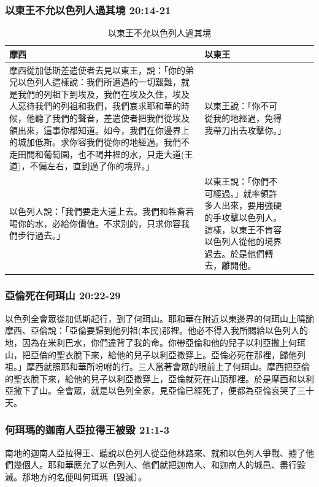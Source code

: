 \subsubsection{以東王不允以色列人過其境 20:14-21}
\begin{table}[H]
\begin{threeparttable}
\begin{tabular}{@{}p{}*{4}{L{\tabcolsep\relax}}@{}}
\toprule
摩西 &  以東王 \\\hline
摩西從加低斯差遣使者去見以東王，說：「你的弟兄以色列人這樣說：我們所遭遇的一切艱難，就是我們的列祖下到埃及，我們在埃及久住，埃及人惡待我們的列祖和我們，我們哀求耶和華的時候，他聽了我們的聲音，差遣使者把我們從埃及領出來，這事你都知道。如今，我們在你邊界上的城加低斯。求你容我們從你的地經過。我們不走田間和葡萄園，也不喝井裡的水，只走大道(王道)，不偏左右，直到過了你的境界。」
&以東王說：「你不可從我的地經過，免得我帶刀出去攻擊你。」\tabularnewline\hline
以色列人說：「我們要走大道上去。我們和牲畜若喝你的水，必給你價值。不求別的，只求你容我們步行過去。」
&以東王說：「你們不可經過。」就率領許多人出來，要用強硬的手攻擊以色列人。這樣，以東王不肯容以色列人從他的境界過去。於是他們轉去，離開他。\tabularnewline
\bottomrule
\end{tabular}
\caption{以東王不允以色列人過其境}
\end{threeparttable}
\end{table} 

\subsubsection{亞倫死在何珥山 20:22-29 }
以色列全會眾從加低斯起行，到了何珥山。耶和華在附近以東邊界的何珥山上曉諭摩西、亞倫說：「亞倫要歸到他列祖(本民)那裡。他必不得入我所賜給以色列人的地，因為在米利巴水，你們違背了我的命。你帶亞倫和他的兒子以利亞撒上何珥山，把亞倫的聖衣脫下來，給他的兒子以利亞撒穿上。亞倫必死在那裡，歸他列祖。」摩西就照耶和華所吩咐的行。三人當著會眾的眼前上了何珥山。摩西把亞倫的聖衣脫下來，給他的兒子以利亞撒穿上，亞倫就死在山頂那裡。於是摩西和以利亞撒下了山。全會眾，就是以色列全家，見亞倫已經死了，便都為亞倫哀哭了三十天。
 
\subsubsection{何珥瑪的迦南人亞拉得王被毀 21:1-3 }
\noindent
南地的迦南人亞拉得王、聽說以色列人從亞他林路來、就和以色列人爭戰、擄了他們幾個人。耶和華應允了以色列人、他們就把迦南人、和迦南人的城邑、盡行毀滅。那地方的名便叫何珥瑪〔毀滅〕。 

